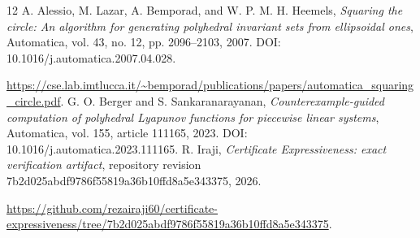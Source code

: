 \documentclass[journal,10pt]{IEEEtran}
\theoremstyle{definition}\newtheorem{definition}{Definition}
\theoremstyle{remark}
\begin{document}
\begin{thebibliography}{12}
 A. Alessio, M. Lazar, A. Bemporad, and W. P. M. H. Heemels,
\emph{Squaring the circle: An algorithm for generating polyhedral invariant sets from ellipsoidal ones},
Automatica, vol. 43, no. 12, pp. 2096--2103, 2007.
DOI: 10.1016/j.automatica.2007.04.028.
\par\url{https://cse.lab.imtlucca.it/~bemporad/publications/papers/automatica_squaring_circle.pdf}.
 G. O. Berger and S. Sankaranarayanan,
\emph{Counterexample-guided computation of polyhedral Lyapunov functions for piecewise linear systems},
Automatica, vol. 155, article 111165, 2023.
DOI: 10.1016/j.automatica.2023.111165.
 R. Iraji, \emph{Certificate Expressiveness: exact verification artifact}, repository revision 7b2d025abdf9786f55819a36b10ffd8a5e343375, 2026.
\par\url{https://github.com/rezairaji60/certificate-expressiveness/tree/7b2d025abdf9786f55819a36b10ffd8a5e343375}.
\end{thebibliography}
\end{document}
